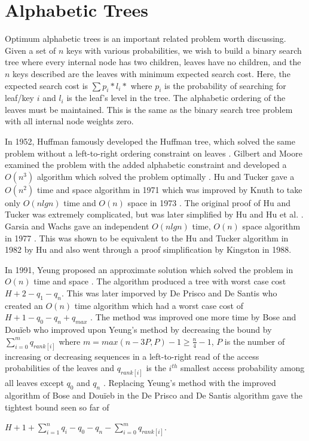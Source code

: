 \documentclass[letterpaper,12pt,titlepage,oneside,final]{book}
\theoremstyle{plain}
\begin{document}
 
\section{Alphabetic Trees}

Optimum alphabetic trees is an important related problem worth discussing. Given a set of $n$ keys with various probabilities, we wish to build a binary search tree where every internal node has two children, leaves have no children, and the $n$ keys described are the leaves with minimum expected search cost. Here, the expected search cost is $\sum p_i * l_i*$ where $p_i$ is the probability of searching for leaf/key $i$ and $l_i$ is the leaf's level in the tree. The alphabetic ordering of the leaves must be maintained. This is the same as the binary search tree problem with all internal node weights zero.

In 1952, Huffman famously developed the Huffman tree, which solved the same problem without a left-to-right ordering constraint on leaves \cite{huffman1952method}. Gilbert and Moore examined the problem with the added alphabetic constraint and developed a $O(n^3)$ algorithm which solved the problem optimally \cite{gilbert1959variable}. Hu and Tucker gave a $O(n^2)$ time and space algorithm in 1971 \cite{hu1971optimal} which was improved by Knuth to take only $O(n lg n)$ time and $O(n)$ space in 1973 \cite{knuth1973sorting}. The original proof of Hu and Tucker was extremely complicated, but was later simplified by Hu \cite{hu1973new} and Hu et al. \cite{hu1979binary}. Garsia and Wachs gave an independent $O(n lg n)$ time, $O(n)$ space algorithm in 1977 \cite{garsia1977new}. This was shown to be equivalent to the Hu and Tucker algorithm in 1982 by Hu \cite{Hu1982Book} and also went through a proof simplification \cite{kingston1988new} by Kingston in 1988.

In 1991, Yeung proposed an approximate solution which solved the problem in $O(n)$ time and space \cite{yeung1991alphabetic}. The algorithm produced a tree with worst case cost $H + 2 - q_1-q_n$. This was later imporved by De Prisco and De Santis who created an $O(n)$ time algorithm which had a worst case cost of $H+1-q_0-q_n+q_{max}$ \cite{de1993binary}. The method was improved one more time by Bose and Dou\"{i}eb who improved upon Yeung's method by decreasing the bound by $\sum_{i=0}^m q_{rank[i]}$ where $m=max({n-3P,P})-1 \geq \frac{n}{4} - 1$, $P$ is the number of increasing or decreasing sequences in a left-to-right read of the access probabilities of the leaves and $q_{rank[i]}$ is the $i^{th}$ smallest access probability among all leaves except $q_0$ and $q_n$ \cite{bose2009efficient}. Replacing Yeung's method with the improved algorithm of Bose and Dou\"{i}eb in the De Prisco and De Santis algorithm gave the tightest bound seen so far of 
\begin{center}
$H+1+\sum_{i=1}^{n}q_i-q_0-q_n-\sum_{i=0}^m q_{rank[i]}$. 
\end{center}
\end{document}
